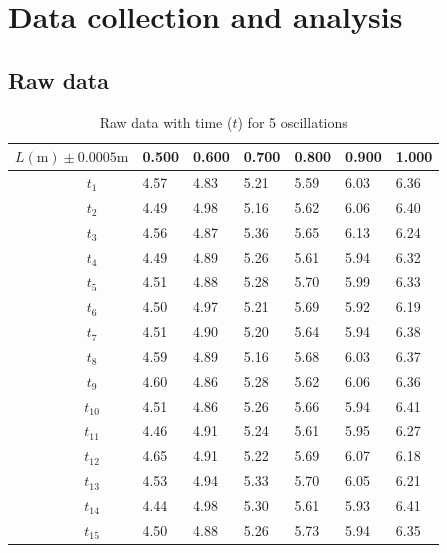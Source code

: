 \documentclass[a4paper,12pt]{article}
\theoremstyle{definition}
\begin{document}
\newpage
\section{Data collection and analysis}
\subsection{Raw data}


\setlength{\extrarowheight}{5pt}
\begin{table}[h]
\begin{center}
\begin{tabular}{l||c|llllll} \toprule
\multicolumn{2}{l||}{$L(\si{\m}) \pm 0.0005 \si{\m}$ }      & 0.500 & 0.600 & 0.700 & 0.800 & 0.900 & 1.000 \\ \midrule
\parbox[t]{2mm}{} 
								   & $t_1$ &   4.57    &  4.83     &   5.21    &   5.59 & 6.03  &6.36\\
                                   & $t_2$ &    4.49   &  4.98     &     5.16  &    5.62 & 6.06 &6.40\\
                                   & $t_3$ &   4.56    &   4.87    &     5.36  &     5.65 & 6.13&6.24\\
                                   & $t_4$ &   4.49    &   4.89    &     5.26  &    5.61 &  5.94&6.32\\
                                   & $t_5$ &   4.51    &    4.88   &     5.28  &   5.70  & 5.99 &6.33\\ 
                                   & $t_6$ &   4.50    &   4.97    &   5.21    &  5.69  &  5.92 &6.19\\
                                   & $t_7$ &     4.51  &    4.90   &    5.20   &   5.64  &  5.94&6.38\\
                                   & $t_8$ &     4.59  &    4.89   &   5.16    &    5.68 &  6.03&6.37\\
                                   & $t_9$ &     4.60  &    4.86   &    5.28   &   5.62  & 6.06 &6.36\\
                                   & $t_{10}$ &    4.51   &    4.86   &    5.26   & 5.66 &   5.94& 6.41 \\ 
                                   & $t_{11}$ &   4.46    &    4.91   &  5.24     &  5.61 & 5.95  & 6.27\\
                                   & $t_{12}$ &   4.65    &    4.91   &   5.22    &  5.69  &  6.07 &6.18\\
                                   & $t_{13}$ &    4.53   &   4.94    &   5.33    &  5.70  &  6.05 &6.21\\
                                   & $t_{14}$ &   4.44    &    4.98   &    5.30   &  5.61  &  5.93 &6.41\\
                                   & $t_{15}$ &     4.50  &     4.88  &   5.26    &   5.73 &  5.94&6.35\\ \bottomrule
\end{tabular}
\end{center}
\caption{Raw data with time ($t$) for 5 oscillations}
\label{tab:rawdata}
\end{table}
\end{document}
